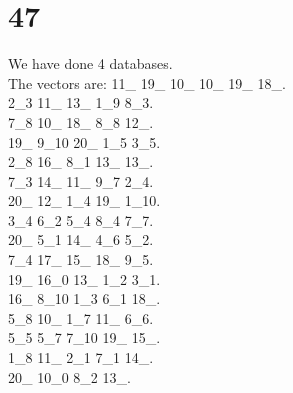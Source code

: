 \chapter{47}
\indent We have done 4 databases.\\
The vectors are:
11\_ 19\_ 10\_ 10\_ 19\_ 18\_.\\2\_3 11\_ 13\_ 1\_9 8\_3.\\7\_8 10\_ 18\_ 8\_8 12\_.\\19\_ 9\_10 20\_ 1\_5 3\_5.\\2\_8 16\_ 8\_1 13\_ 13\_.\\7\_3 14\_ 11\_ 9\_7 2\_4.\\20\_ 12\_ 1\_4 19\_ 1\_10.\\3\_4 6\_2 5\_4 8\_4 7\_7.\\20\_ 5\_1 14\_ 4\_6 5\_2.\\7\_4 17\_ 15\_ 18\_ 9\_5.\\19\_ 16\_0 13\_ 1\_2 3\_1.\\16\_ 8\_10 1\_3 6\_1 18\_.\\5\_8 10\_ 1\_7 11\_ 6\_6.\\5\_5 5\_7 7\_10 19\_ 15\_.\\1\_8 11\_ 2\_1 7\_1 14\_.\\20\_ 10\_0 8\_2 13\_.\\
